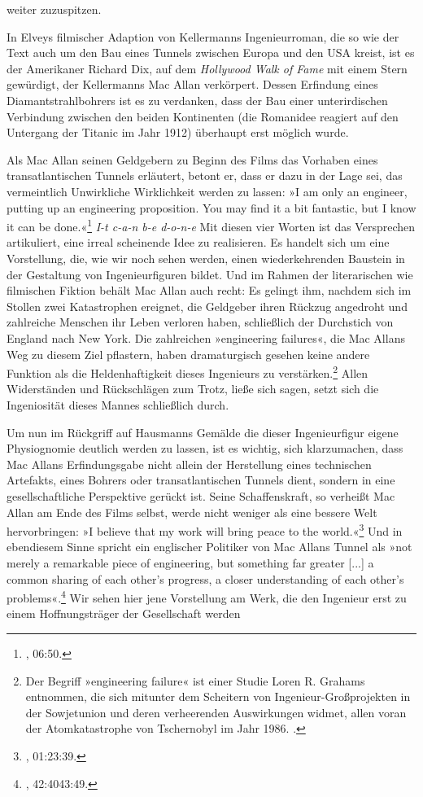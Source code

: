 \documentclass[%
	fontsize=10pt,%
	twoside,%
	headings=optiontoheadandtoc,%
	showtrims]{scrbook}
\begin{document}
weiter zuzuspitzen.\par In Elveys filmischer Adaption von Kellermanns Ingenieurroman, die so wie der Text auch um den Bau eines Tunnels zwischen Europa und den USA kreist, ist es der Amerikaner Richard Dix, auf dem \emph{Hollywood Walk of Fame} mit einem Stern gewürdigt, der Kellermanns Mac Allan verkörpert. Dessen Erfindung eines Diamantstrahlbohrers ist es zu verdanken, dass der Bau einer unterirdischen Verbindung zwischen den beiden Kontinenten (die Roman\-idee reagiert auf den Untergang der Titanic im Jahr 1912) überhaupt erst möglich wurde.\par Als Mac Allan seinen Geldgebern zu Beginn des Films das Vorhaben eines transatlantischen Tunnels erläutert, betont er, dass er dazu in der Lage sei, das vermeintlich Unwirkliche Wirklichkeit werden zu lassen: »I am only an engineer, putting up an engineering proposition. You may find it a bit fantastic, but I know it can be done.«\footnote{\cite[][]{elevy1935a}, 06:50.}  \emph{I-t c-a-n b-e d-o-n-e} \textendash{} Mit diesen vier Worten ist das Versprechen artikuliert, eine irreal scheinende Idee zu realisieren. Es handelt sich um eine Vorstellung, die, wie wir noch sehen werden, einen wiederkehrenden Baustein in der Gestaltung von Ingenieurfiguren bildet. Und im Rahmen der literarischen wie filmischen Fiktion behält Mac Allan auch recht: Es gelingt ihm, nachdem sich im Stollen zwei Katastrophen ereignet, die Geld\-geber ihren Rückzug angedroht und zahlreiche Menschen ihr Leben verloren haben, schließlich der Durchstich von England nach New York. Die zahlreichen »engineering failures«, die Mac Allans Weg zu diesem Ziel pflastern, haben dramaturgisch gesehen keine andere Funktion als die Heldenhaftigkeit dieses Ingenieurs zu verstärken.\footnote{Der Begriff »engineering failure« ist einer Studie Loren R. Grahams entnommen, die sich mitunter dem Scheitern von Ingenieur-Großprojekten in der Sowjetunion und deren verheerenden Auswirkungen widmet, allen voran der Atomkatastrophe von Tschernobyl im Jahr 1986. \cite[][]{graham1993a}.}  Allen Widerständen und Rückschlägen zum Trotz, ließe sich sagen, setzt sich die Ingeniosität dieses Mannes schließlich durch.\par Um nun \textendash{} im Rückgriff auf Hausmanns Gemälde \textendash{} die dieser Ingenieurfigur eigene Physiognomie deutlich werden zu lassen, ist es wichtig, sich klarzumachen, dass Mac Allans Erfindungsgabe nicht allein der Herstellung eines technischen Artefakts, eines Bohrers oder transatlantischen Tunnels dient, sondern in eine gesellschaftliche Perspektive gerückt ist. Seine Schaffenskraft, so verheißt Mac Allan am Ende des Films selbst, werde nicht weniger als eine bessere Welt hervorbringen: »I believe that my work will bring peace to the world.«\footnote{\cite[][]{elevy1935a}, 01:23:39.}  Und in ebendiesem Sinne spricht ein englischer Politiker von Mac Allans Tunnel als »not merely a remarkable piece of engineering, but something far greater {[}...{]} a common sharing of each other\textquoteright{}s progress, a closer understanding of each other\textquoteright{}s problems«.\footnote{\cite[][]{elevy1935a}, 42:40\textendash{}43:49.}  Wir sehen hier jene Vorstellung am Werk, die den Ingenieur erst zu einem Hoffnungsträger der Gesellschaft werden 
\end{document}
